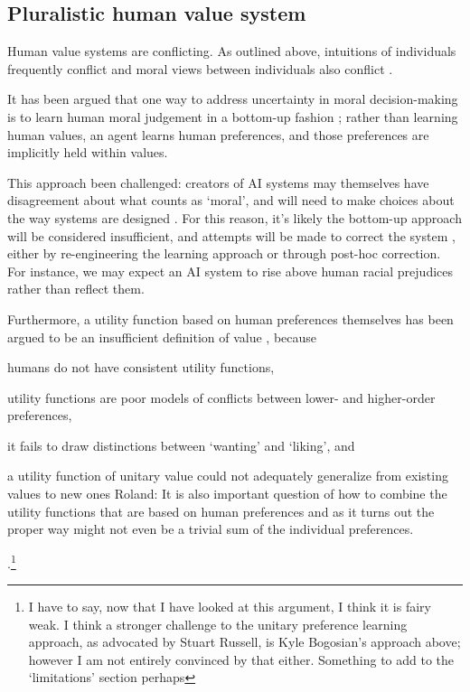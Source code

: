 


\subsection{Pluralistic human value system}

Human value systems are conflicting. As outlined above, intuitions of individuals frequently conflict \cite{haidt2001emotional} and moral views between individuals also conflict \cite{bogosian_implementation_2017}. 

It has been argued that one way to address uncertainty in moral decision-making is to learn human moral judgement in a bottom-up fashion \cite{bogosian_implementation_2017}; rather than learning human values, an agent learns human preferences, and those preferences are implicitly held within values. 

This approach been challenged: creators of AI systems may themselves have disagreement about what counts as `moral', and will need to make choices about the way systems are designed  \cite{bogosian_implementation_2017}. For this reason, it's likely the bottom-up approach will be considered insufficient, and attempts will be made to correct the system \cite{stray2020you}, either by re-engineering the learning approach or through post-hoc correction. For instance, we may expect an AI system to rise above human racial prejudices rather than reflect them. 

Furthermore, a utility function based on human preferences themselves has been argued to be an insufficient definition of value \cite{sotala2016defining, DBLP:journals/corr/abs-1712-05812}, because \begin{enumerate*}
    \item humans do not have consistent utility functions,
    \item utility functions are poor models of conflicts between lower- and higher-order preferences,
    \item it fails to draw distinctions between `wanting' and `liking', and
    \item a utility function of unitary value could not adequately generalize from existing values to new ones
Roland: It is also important question of how to combine the utility functions that are based on human preferences and as it turns out the proper way might not even be a trivial sum of the individual preferences.    
\end{enumerate*}.\footnote{I have to say, now that I have looked at this argument, I think it is fairy weak. I think a stronger challenge to the unitary preference learning approach, as advocated by Stuart Russell, is Kyle Bogosian's approach above; however I am not entirely convinced by that either. Something to add to the `limitations' section perhaps}



